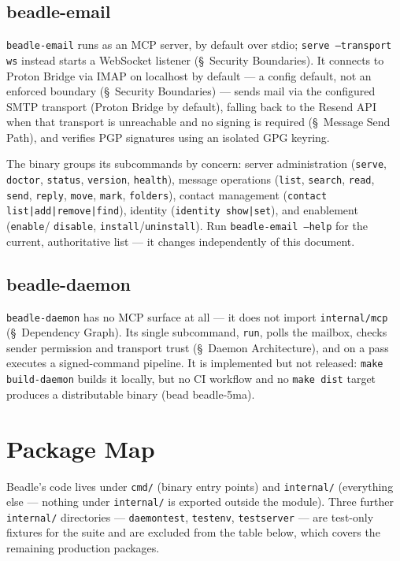 \documentclass[a4paper,10pt,fleqn]{article}
\begin{document}
\subsection{beadle-email}

\texttt{beadle-email} runs as an MCP server, by default over stdio;
\texttt{serve --transport ws} instead starts a WebSocket listener
(\S~Security Boundaries).  It connects to Proton Bridge via IMAP on
localhost by default --- a config default, not an enforced boundary
(\S~Security Boundaries) --- sends mail via the configured SMTP
transport (Proton Bridge by default), falling back to the Resend API
when that transport is unreachable and no signing is required
(\S~Message Send Path), and verifies PGP signatures using an isolated
GPG keyring.

The binary groups its subcommands by concern: server administration
(\texttt{serve}, \texttt{doctor}, \texttt{status}, \texttt{version},
\texttt{health}), message operations (\texttt{list}, \texttt{search},
\texttt{read}, \texttt{send}, \texttt{reply}, \texttt{move},
\texttt{mark}, \texttt{folders}), contact management
(\texttt{contact list|add|remove|find}), identity
(\texttt{identity show|set}), and enablement (\texttt{enable}/
\texttt{disable}, \texttt{install}/\texttt{uninstall}).  Run
\texttt{beadle-email --help} for the current, authoritative list ---
it changes independently of this document.

\subsection{beadle-daemon}

\texttt{beadle-daemon} has no MCP surface at all --- it does not
import \texttt{internal/mcp} (\S~Dependency Graph).  Its single
subcommand, \texttt{run}, polls the mailbox, checks sender permission
and transport trust (\S~Daemon Architecture), and on a pass executes a
signed-command pipeline.  It is implemented but not released:
\texttt{make build-daemon} builds it locally, but no CI workflow and
no \texttt{make dist} target produces a distributable binary (bead
beadle-5ma).

\section{Package Map}

Beadle's code lives under \texttt{cmd/} (binary entry points) and
\texttt{internal/} (everything else --- nothing under
\texttt{internal/} is exported outside the module). Three further
\texttt{internal/} directories --- \texttt{daemontest},
\texttt{testenv}, \texttt{testserver} --- are test-only fixtures for
the suite and are excluded from the table below, which covers the
remaining production packages.
\end{document}
